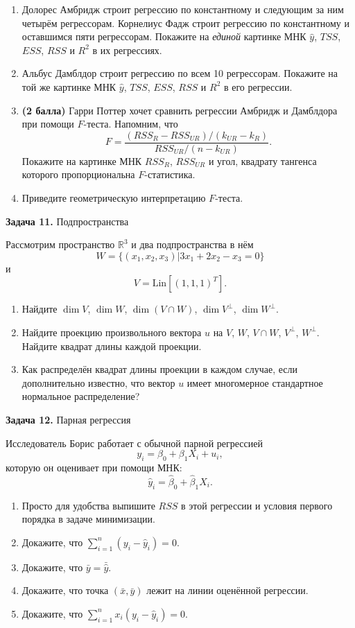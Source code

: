 \documentclass[10pt, a4paper]{extarticle}
\def \R{\mathbb{R}}
\begin{document}
	\begin{enumerate}
		\item Долорес Амбридж строит регрессию по константному и следующим за ним четырём регрессорам. Корнелиус Фадж строит регрессию по константному и оставшимся пяти регрессорам. Покажите на \textit{единой} картинке МНК $\hat{y}$, $TSS$, $ESS$, $RSS$ и $R^2$ в их регрессиях.
		\item Альбус Дамблдор строит регрессию по всем 10 регрессорам. Покажите на той же картинке МНК $\hat{y}$, $TSS$, $ESS$, $RSS$ и $R^2$ в его регрессии.
		\item \textbf{(2 балла)} Гарри Поттер хочет сравнить регрессии Амбридж и Дамблдора при помощи $F$-теста. Напомним, что 
		\[
		F = \dfrac{(RSS_R - RSS_{UR}) / (k_{UR} - k_R)}{RSS_{UR} / (n - k_{UR})}.
		\]
		Покажите на картинке МНК $RSS_R$, $RSS_{UR}$ и угол, квадрату тангенса которого пропорциональна $F$-статистика.
		\item Приведите геометрическую интерпретацию $F$-теста. 
	\end{enumerate}

	{\Large \textbf{Задача 11.} Подпространства}
	
	Рассмотрим пространство $\R^3$ и два подпространства в нём
	\[
	W = \{(x_1, x_2, x_3) | 3x_1 + 2x_2 - x_3 = 0\}
	\]
	и
	\[
	V = \mathrm{Lin}[(1, 1, 1)^T].
	\]
	
	\begin{enumerate}
		\item Найдите $\dim V$, $\dim W$, $\dim (V \cap W)$, $\dim V^{\perp}$, $\dim W^{\perp}$.
		\item Найдите проекцию произвольного вектора $u$ на $V$, $W$, $V \cap W$, $V^{\perp}$, $W^{\perp}$. Найдите квадрат длины каждой проекции.
		\item Как распределён квадрат длины проекции в каждом случае, если дополнительно известно, что вектор $u$ имеет многомерное стандартное нормальное распределение?
	\end{enumerate}
	
	{\Large \textbf{Задача 12.} Парная регрессия}
	
	Исследователь Борис работает с обычной парной регрессией
	\[
	y_i = \beta_0 + \beta_1 X_i + u_i,
	\]
	которую он оценивает при помощи МНК:
	\[
	\hat{y}_i = \hat{\beta}_0 + \hat{\beta}_1 X_i .
	\]
	
	\begin{enumerate}
		\item Просто для удобства выпишите $RSS$ в этой регрессии и условия первого порядка в задаче минимизации. 
		\item Докажите, что $\sum_{i = 1}^{n} (y_i - \hat{y}_i) = 0$.
		\item Докажите, что $\bar{y} = \bar{\hat{y}}$.
		\item Докажите, что точка $(\bar{x}, \bar{y})$ лежит на линии оценённой регрессии.
		\item Докажите, что $\sum_{i = 1}^n x_i(y_i -\hat{y}_i) = 0$.
	\end{enumerate}
\end{document}
